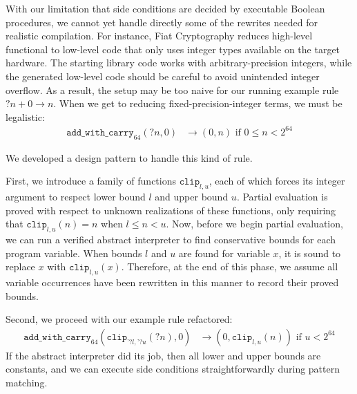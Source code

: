\documentclass[sn-mathphys,pdflatex]{sn-jnl}%
\theoremstyle{thmstyleone}%
\theoremstyle{thmstyletwo}%
\theoremstyle{thmstylethree}%
\begin{document}
With our limitation that side conditions are decided by executable Boolean procedures, we cannot yet handle directly some of the rewrites needed for realistic compilation.
For instance, Fiat Cryptography reduces high-level functional to low-level code that only uses integer types available on the target hardware.
The starting library code works with arbitrary-precision integers, while the generated low-level code should be careful to avoid unintended integer overflow.
As a result, the setup may be too naive for our running example rule ${?n} + 0 \to n$.
When we get to reducing fixed-precision-integer terms, we must be legalistic:
\begin{align*}
  \texttt{add\_with\_carry}_{64}({?n}, 0) & \to (0, n)\text{\ \ if\ \ }0 \le n < 2^{64}
\end{align*}

We developed a design pattern to handle this kind of rule.

First, we introduce a family of functions $\texttt{clip}_{l,u}$, each of which forces its integer argument to respect lower bound $l$ and upper bound $u$.
Partial evaluation is proved with respect to unknown realizations of these functions, only requiring that $\texttt{clip}_{l, u}(n) = n$ when $l \leq n < u$.
Now, before we begin partial evaluation, we can run a verified abstract interpreter to find conservative bounds for each program variable.
When bounds $l$ and $u$ are found for variable $x$, it is sound to replace $x$ with $\texttt{clip}_{l,u}(x)$.
Therefore, at the end of this phase, we assume all variable occurrences have been rewritten in this manner to record their proved bounds.

Second, we proceed with our example rule refactored:
\begin{align*}
  \texttt{add\_with\_carry}_{64}(\texttt{clip}_{\texttt{'}{?l},\texttt{'}{?u}}({?n}), 0) & \to (0, \texttt{clip}_{l,u}(n)) %
  \text{\ \ if\ \ }u < 2^{64}
\end{align*}
If the abstract interpreter did its job, then all lower and upper bounds are constants, and we can execute side conditions straightforwardly during pattern matching.
\end{document}
